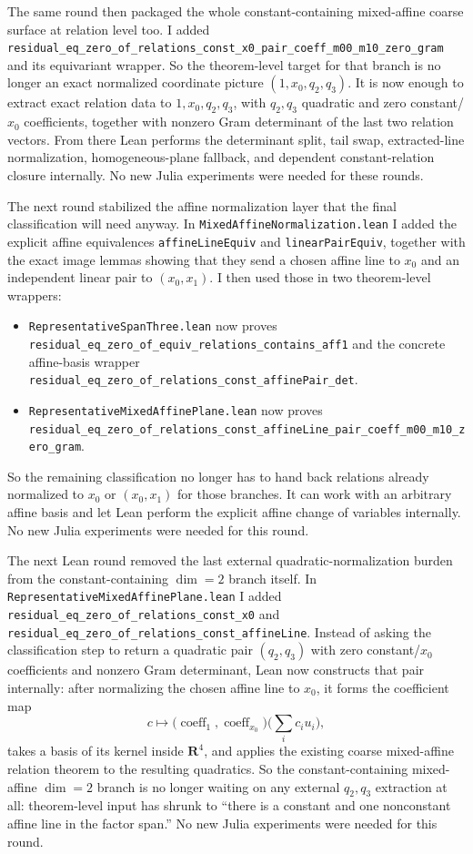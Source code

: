 \documentclass[11pt]{article}
\begin{document}
The same round then packaged the whole constant-containing mixed-affine coarse
surface at relation level too. I added
\texttt{residual\_eq\_zero\_of\_relations\_const\_x0\_pair\_coeff\_m00\_m10\_zero\_gram}
and its equivariant wrapper. So the theorem-level target for that branch is no
longer an exact normalized coordinate picture \((1,x_0,q_2,q_3)\). It is now
enough to extract exact relation data to \(1,x_0,q_2,q_3\), with \(q_2,q_3\)
quadratic and zero constant/\(x_0\) coefficients, together with nonzero Gram
determinant of the last two relation vectors. From there Lean performs the
determinant split, tail swap, extracted-line normalization, homogeneous-plane
fallback, and dependent constant-relation closure internally. No new Julia
experiments were needed for these rounds.

The next round stabilized the affine normalization layer that the final
classification will need anyway. In
\texttt{MixedAffineNormalization.lean} I added the explicit affine
equivalences \texttt{affineLineEquiv} and \texttt{linearPairEquiv}, together
with the exact image lemmas showing that they send a chosen affine line to
\(x_0\) and an independent linear pair to \((x_0,x_1)\). I then used those in
two theorem-level wrappers:
\begin{itemize}
\item \texttt{RepresentativeSpanThree.lean} now proves
\texttt{residual\_eq\_zero\_of\_equiv\_relations\_contains\_aff1} and the
concrete affine-basis wrapper
\texttt{residual\_eq\_zero\_of\_relations\_const\_affinePair\_det}.
\item \texttt{RepresentativeMixedAffinePlane.lean} now proves
\texttt{residual\_eq\_zero\_of\_relations\_const\_affineLine\_pair\_coeff\_m00\_m10\_zero\_gram}.
\end{itemize}
So the remaining classification no longer has to hand back relations already
normalized to \(x_0\) or \((x_0,x_1)\) for those branches. It can work with an
arbitrary affine basis and let Lean perform the explicit affine change of
variables internally. No new Julia experiments were needed for this round.

The next Lean round removed the last external quadratic-normalization burden
from the constant-containing \(\dim=2\) branch itself. In
\texttt{RepresentativeMixedAffinePlane.lean} I added
\texttt{residual\_eq\_zero\_of\_relations\_const\_x0} and
\texttt{residual\_eq\_zero\_of\_relations\_const\_affineLine}. Instead of
asking the classification step to return a quadratic pair
\((q_2,q_3)\) with zero constant/\(x_0\) coefficients and nonzero Gram
determinant, Lean now constructs that pair internally: after normalizing the
chosen affine line to \(x_0\), it forms the coefficient map
\[
  c \longmapsto
  \bigl(\operatorname{coeff}_1,\operatorname{coeff}_{x_0}\bigr)
  \bigl(\sum_i c_i u_i\bigr),
\]
takes a basis of its kernel inside \(\mathbf{R}^4\), and applies the existing
coarse mixed-affine relation theorem to the resulting quadratics. So the
constant-containing mixed-affine \(\dim=2\) branch is no longer waiting on any
external \(q_2,q_3\) extraction at all: theorem-level input has shrunk to
``there is a constant and one nonconstant affine line in the factor span.''
No new Julia experiments were needed for this round.
\end{document}

